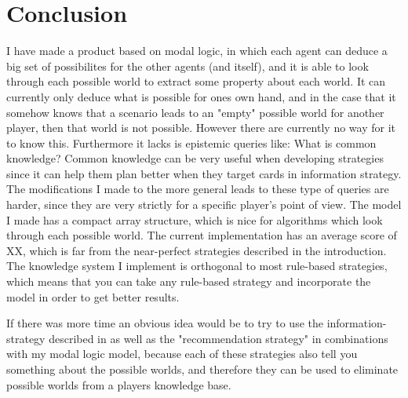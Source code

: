\section{Conclusion}

I have made a product based on modal logic, in which each agent can deduce a big set of possibilites for the other agents (and itself), and it is able to look through each possible world to extract some property about each world. It can currently only deduce what is possible for ones own hand, and in the case that it somehow knows that a scenario leads to an "empty" possible world for another player, then that world is not possible. However there are currently no way for it to know this. Furthermore it lacks is epistemic queries like: What is common knowledge? Common knowledge can be very useful when developing strategies since it can help them plan better when they target cards in \cite{CoxEtAl2015} information strategy. The modifications I made to the more general \KTfourfiveN leads to these type of queries are harder, since they are very strictly for a specific player's point of view. 
The model I made has a compact array structure, which is nice for algorithms which look through each possible world.
The current implementation has an average score of XX, which is far from the near-perfect strategies described in the introduction. The knowledge system I implement is orthogonal to most rule-based strategies, which means that you can take any rule-based strategy and incorporate the model in order to get better results.

If there was more time an obvious idea would be to try to use the information-strategy described in \cite{CoxEtAl2015} as well as the "recommendation strategy" in combinations with my modal logic model, because each of these strategies also tell you something about the possible worlds, and therefore they can be used to eliminate possible worlds from a players knowledge base.

